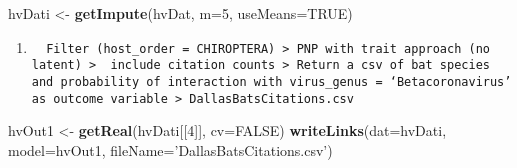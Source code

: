 \documentclass[
]{article}
\newenvironment{Shaded}{\begin{snugshade}}{\end{snugshade}}
\newcommand{\ControlFlowTok}[1]{\textcolor[rgb]{0.13,0.29,0.53}{\textbf{#1}}}
\newcommand{\DataTypeTok}[1]{\textcolor[rgb]{0.13,0.29,0.53}{#1}}
\newcommand{\DecValTok}[1]{\textcolor[rgb]{0.00,0.00,0.81}{#1}}
\newcommand{\KeywordTok}[1]{\textcolor[rgb]{0.13,0.29,0.53}{\textbf{#1}}}
\newcommand{\NormalTok}[1]{#1}
\newcommand{\OperatorTok}[1]{\textcolor[rgb]{0.81,0.36,0.00}{\textbf{#1}}}
\newcommand{\OtherTok}[1]{\textcolor[rgb]{0.56,0.35,0.01}{#1}}
\newcommand{\StringTok}[1]{\textcolor[rgb]{0.31,0.60,0.02}{#1}}
\begin{document}
\begin{Shaded}
\end{Shaded}

\begin{Shaded}
\begin{Highlighting}[]
\NormalTok{hvDati <-}\StringTok{ }\KeywordTok{getImpute}\NormalTok{(hvDat, }\DataTypeTok{m=}\DecValTok{5}\NormalTok{, }\DataTypeTok{useMeans=}\OtherTok{TRUE}\NormalTok{)}
\end{Highlighting}
\end{Shaded}

\begin{enumerate}
\def\labelenumi{\arabic{enumi}.}
\setcounter{enumi}{2}
\item
\begin{verbatim}
  Filter (host_order = CHIROPTERA) > PNP with trait approach (no latent) >  include citation counts > Return a csv of bat species and probability of interaction with virus_genus = ‘Betacoronavirus’ as outcome variable > DallasBatsCitations.csv
\end{verbatim}
\end{enumerate}

\begin{Shaded}
\begin{Highlighting}[]
\NormalTok{hvOut1 <-}\StringTok{ }\KeywordTok{getReal}\NormalTok{(hvDati[[}\DecValTok{4}\NormalTok{]], }\DataTypeTok{cv=}\OtherTok{FALSE}\NormalTok{)}
\KeywordTok{writeLinks}\NormalTok{(}\DataTypeTok{dat=}\NormalTok{hvDati, }\DataTypeTok{model=}\NormalTok{hvOut1, }\DataTypeTok{fileName=}\StringTok{'DallasBatsCitations.csv'}\NormalTok{)}
\end{Highlighting}
\end{Shaded}
\end{document}
